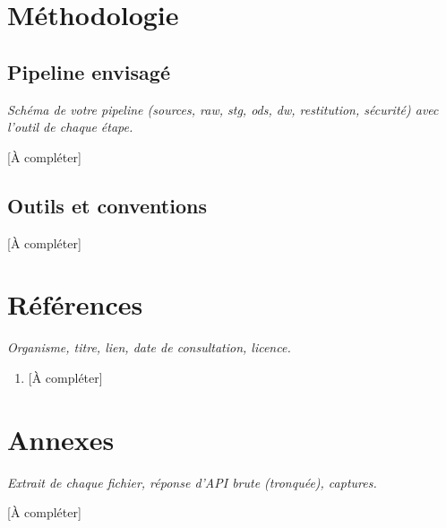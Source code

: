 \documentclass[11pt,a4paper]{article}
\newcommand{\aide}[1]{{\small\color{gris}\itshape #1}\par}
\newcommand{\todo}{{\color{red!70!black}[À compléter]}}
\begin{document}
\section{Méthodologie}
\subsection{Pipeline envisagé}
\aide{Schéma de votre pipeline (sources, raw, stg, ods, dw, restitution, sécurité) avec l'outil de chaque étape.}
\todo
\subsection{Outils et conventions}
\todo
\section{Références}
\aide{Organisme, titre, lien, date de consultation, licence.}
\begin{enumerate}
\item \todo
\end{enumerate}

\appendix
\section{Annexes}
\aide{Extrait de chaque fichier, réponse d'API brute (tronquée), captures.}
\todo
\end{document}
